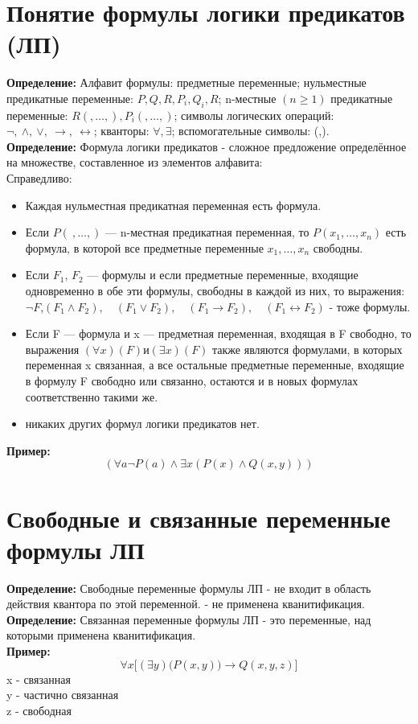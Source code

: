 \documentclass[../main.tex]{subfiles}
\begin{document}
\section{Понятие формулы логики предикатов (ЛП)}
\textbf{Определение:
} Алфавит формулы: предметные переменные; нульместные предикатные переменные: $P,Q,R,P_i,Q_i,R$; n-местные $(n\geqslant1)$ предикатные переменные: $R(,\ldots,),P_i(,\ldots,)$; символы логических операций: $\lnot,~ \land,~ \lor,~ \to,~ \leftrightarrow$; кванторы: $\forall, \exists$; вспомогательные символы: (,). \\
\textbf{
	Определение:
} Формула логики предикатов - сложное предложение определённое на множестве, составленное из элементов алфавита:\\
Справедливо:
\begin{itemize}
	\item Каждая нульместная предикатная переменная есть формула.
	\item Если $P(~,\ldots,)$ — n-местная предикатная переменная, то $P(x_1,\ldots,x_n)$ есть формула, в которой все предметные переменные $x_1,\ldots,x_n$ свободны.
	\item Если $F_1,\,F_2$ — формулы и если предметные переменные, входящие одновременно в обе эти формулы, свободны в каждой из них, то выражения:$\lnot F$,$(F_1\land F_2),\quad (F_1\lor F_2),\quad (F_1\to F_2),\quad (F_1\leftrightarrow F_2)$ - тоже формулы. 
	\item Если F — формула и x — предметная переменная, входящая в F свободно, то выражения $(\forall x)(F) и (\exists x)(F)$ также являются формулами, в которых переменная x связанная, а все остальные предметные переменные, входящие в формулу F свободно или связанно, остаются и в новых формулах соответственно такими же.
	\item никаких других формул логики предикатов нет.
\end{itemize}
\textbf{Пример:
}\[(\forall a \lnot P(a) \land \exists x(P (x) \land Q(x, y)))\]

\section{Свободные и связанные переменные формулы ЛП}
\textbf{Определение:
} Свободные переменные формулы ЛП - не входит в область действия квантора по этой переменной. - не применена кванитификация. \\
\textbf{Определение:
} Связанная переменные формулы ЛП - это переменные, над которыми применена кванитификация. \\
\textbf{Пример:
} \[\forall  x \bigl[(\exists y)\bigl(P(x, y)\bigr) \to Q(x, y, z)\bigr]\]
x - связанная \\
y - частично связанная \\
z - свободная \\
\end{document}
